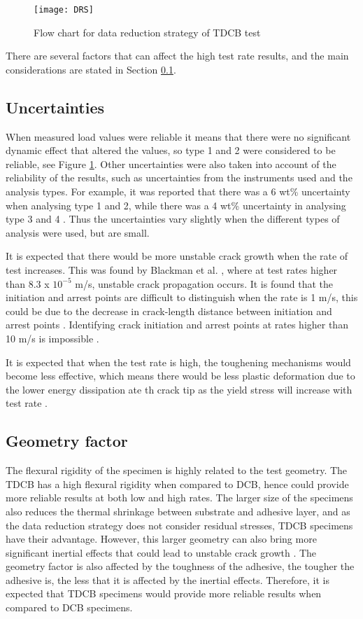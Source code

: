 \documentclass[numbers=noendperiod,chapterprefix=on]{icldt} %
\begin{document}
\begin{figure}[!htpb]
\centering
\texttt{[image: DRS]}
\caption{Flow chart for data reduction strategy of TDCB test \cite{Huang1992}} \label{DataReduction}
\end{figure}

There are several factors that can affect the high test rate results, and the main considerations are stated in Section \ref{Uncertainties}.

\subsection{Uncertainties} \label{Uncertainties}
When measured load values were reliable it means that there were no significant dynamic effect that altered the values, so type 1 and 2 were considered to be reliable, see Figure \ref{DataReduction}.
Other uncertainties were also taken into account of the reliability of the results, such as uncertainties from the instruments used and the analysis types. For example, it was reported that there was a 6 wt\% uncertainty when analysing type 1 and 2, while there was a 4 wt\% uncertainty in analysing type 3 and 4 \cite{BlackmanB.R.K.2009}. Thus the uncertainties vary slightly when the different types of analysis were used, but are small.

It is expected that there would be more unstable crack growth when the rate of test increases. This was found by Blackman et al. \cite{Blackman2012}, where at test rates higher than $ 8.3$ x $10^{-5} $ m/s, unstable crack propagation occurs.
It is found that the initiation and arrest points are difficult to distinguish when the rate is 1 m/s, this could be due to the decrease in crack-length distance between initiation and arrest points \cite{RodriguezSanchez2008}. Identifying crack initiation and arrest points at rates higher than 10 m/s is impossible \cite{Blackman1996}. 

It is expected that when the test rate is high, the toughening mechanisms would become less effective, which means there would be less plastic deformation due to the lower energy dissipation ate th crack tip as the yield stress will increase with test rate \cite{BlackmanB.R.K.2009}.

\subsection{Geometry factor}
The flexural rigidity of the specimen is highly related to the test geometry. The TDCB has a high flexural rigidity when compared to DCB, hence could provide more reliable results at both low and high rates. The larger size of the specimens also reduces the thermal shrinkage between substrate and adhesive layer, and as the data reduction strategy does not consider residual stresses, TDCB specimens have their advantage. However, this larger geometry can also bring more significant inertial effects that could lead to unstable crack growth \cite{Blackman1995}. The geometry factor is also affected by the toughness of the adhesive, the tougher the adhesive is, the less that it is affected by the inertial effects. Therefore, it is expected that TDCB specimens would provide more reliable results when compared to DCB specimens. 
\end{document}
